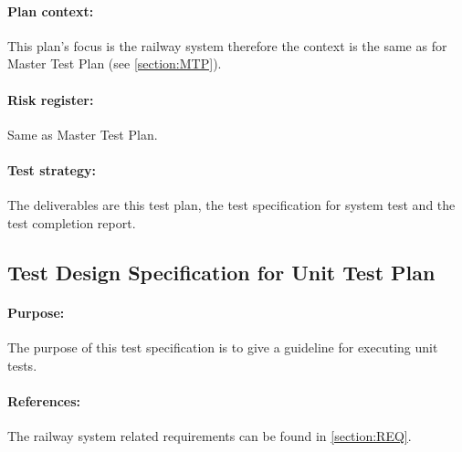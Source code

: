 \paragraph{Plan context:} This plan's focus is the railway system therefore the context is the same as for Master Test Plan (see \autoref{section:MTP}).
\paragraph{Risk register:} Same as Master Test Plan.
\paragraph{Test strategy:} The deliverables are this test plan, the test specification for system test and the test completion report.






\subsection{Test Design Specification for Unit Test Plan}

\paragraph{Purpose:} The purpose of this test specification is to give a guideline for executing unit tests.
\paragraph{References:} The railway system related requirements can be found in \autoref{section:REQ}.

